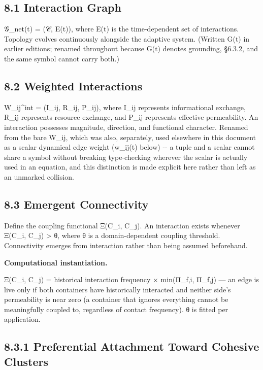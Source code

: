 \documentclass[
]{article}
\begin{document}
\hypertarget{interaction-graph}{%
\subsection{8.1 Interaction Graph}\label{interaction-graph}}

𝒢\_net(t) = (𝒞, E(t)), where E(t) is the time-dependent set of
interactions. Topology evolves continuously alongside the adaptive
system. (Written G(t) in earlier editions; renamed throughout because
G(t) denotes grounding, §6.3.2, and the same symbol cannot carry both.)

\hypertarget{weighted-interactions}{%
\subsection{8.2 Weighted Interactions}\label{weighted-interactions}}

W\_ij\^{}int = (I\_ij, R\_ij, P\_ij), where I\_ij represents
informational exchange, R\_ij represents resource exchange, and P\_ij
represents effective permeability. An interaction possesses magnitude,
direction, and functional character. Renamed from the bare W\_ij, which
was also, separately, used elsewhere in this document as a scalar
dynamical edge weight (w\_ij(t) below) -\/- a tuple and a scalar cannot
share a symbol without breaking type-checking wherever the scalar is
actually used in an equation, and this distinction is made explicit here
rather than left as an unmarked collision.

\hypertarget{emergent-connectivity}{%
\subsection{8.3 Emergent Connectivity}\label{emergent-connectivity}}

Define the coupling functional Ξ(C\_i, C\_j). An interaction exists
whenever Ξ(C\_i, C\_j) \textgreater{} θ, where θ is a domain-dependent
coupling threshold. Connectivity emerges from interaction rather than
being assumed beforehand.

\textbf{Computational instantiation.}

Ξ(C\_i, C\_j) = historical interaction frequency × min(Π\_f,i, Π\_f,j)
--- an edge is live only if both containers have historically interacted
and neither side's permeability is near zero (a container that ignores
everything cannot be meaningfully coupled to, regardless of contact
frequency). θ is fitted per application.

\hypertarget{preferential-attachment-toward-cohesive-clusters}{%
\subsection{8.3.1 Preferential Attachment Toward Cohesive
Clusters}\label{preferential-attachment-toward-cohesive-clusters}}
\end{document}
